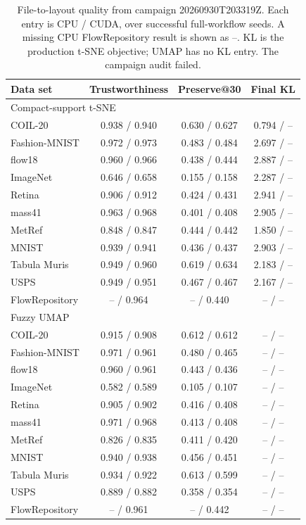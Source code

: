 \begin{table}[p]
\centering
\scriptsize
\caption{File-to-layout quality from campaign 20260930T203319Z. Each entry is CPU / CUDA, over successful full-workflow seeds. A missing CPU FlowRepository result is shown as --. KL is the production t-SNE objective; UMAP has no KL entry. The campaign audit failed.}
\label{tab:native-quality}
\begin{tabular}{lccc}
\toprule
Data set & Trustworthiness & Preserve@30 & Final KL \\
\midrule
\multicolumn{4}{l}{Compact-support t-SNE} \\
COIL-20 & 0.938 / 0.940 & 0.630 / 0.627 & 0.794 / -- \\
Fashion-MNIST & 0.972 / 0.973 & 0.483 / 0.484 & 2.697 / -- \\
flow18 & 0.960 / 0.966 & 0.438 / 0.444 & 2.887 / -- \\
ImageNet & 0.646 / 0.658 & 0.155 / 0.158 & 2.287 / -- \\
Retina & 0.906 / 0.912 & 0.424 / 0.431 & 2.941 / -- \\
mass41 & 0.963 / 0.968 & 0.401 / 0.408 & 2.905 / -- \\
MetRef & 0.848 / 0.847 & 0.444 / 0.442 & 1.850 / -- \\
MNIST & 0.939 / 0.941 & 0.436 / 0.437 & 2.903 / -- \\
Tabula Muris & 0.949 / 0.960 & 0.619 / 0.634 & 2.183 / -- \\
USPS & 0.949 / 0.951 & 0.467 / 0.467 & 2.167 / -- \\
FlowRepository & -- / 0.964 & -- / 0.440 & -- / -- \\
\midrule
\multicolumn{4}{l}{Fuzzy UMAP} \\
COIL-20 & 0.915 / 0.908 & 0.612 / 0.612 & -- / -- \\
Fashion-MNIST & 0.971 / 0.961 & 0.480 / 0.465 & -- / -- \\
flow18 & 0.960 / 0.961 & 0.443 / 0.436 & -- / -- \\
ImageNet & 0.582 / 0.589 & 0.105 / 0.107 & -- / -- \\
Retina & 0.905 / 0.902 & 0.416 / 0.408 & -- / -- \\
mass41 & 0.971 / 0.968 & 0.413 / 0.408 & -- / -- \\
MetRef & 0.826 / 0.835 & 0.411 / 0.420 & -- / -- \\
MNIST & 0.940 / 0.938 & 0.456 / 0.451 & -- / -- \\
Tabula Muris & 0.934 / 0.922 & 0.613 / 0.599 & -- / -- \\
USPS & 0.889 / 0.882 & 0.358 / 0.354 & -- / -- \\
FlowRepository & -- / 0.961 & -- / 0.442 & -- / -- \\
\bottomrule
\end{tabular}
\end{table}
